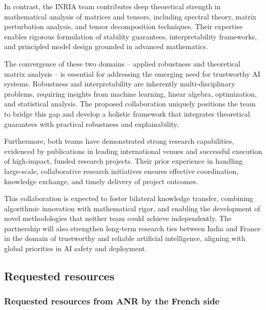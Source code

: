 \documentclass[a4paper,11pt]{article}
\begin{document}
In contrast, the INRIA team contributes deep theoretical strength in mathematical analysis of matrices and tensors, including spectral theory, matrix perturbation analysis, and tensor decomposition techniques. Their expertise enables rigorous formulation of stability guarantees, interpretability frameworks, and principled model design grounded in advanced mathematics.

The convergence of these two domains -- applied robustness and theoretical matrix analysis -- is essential for addressing the emerging need for trustworthy AI systems. Robustness and interpretability are inherently multi-disciplinary problems, requiring insights from machine learning, linear algebra, optimization, and statistical analysis. The proposed collaboration uniquely positions the team to bridge this gap and develop a holistic framework that integrates theoretical guarantees with practical robustness and explainability.

Furthermore, both teams have demonstrated strong research capabilities, evidenced by publications in leading international venues and successful execution of high-impact, funded research projects. Their prior experience in handling large-scale, collaborative research initiatives ensures effective coordination, knowledge exchange, and timely delivery of project outcomes.

This collaboration is expected to foster bilateral knowledge transfer, combining algorithmic innovation with mathematical rigor, and enabling the development of novel methodologies that neither team could achieve independently. The partnership will also strengthen long-term research ties between India and France in the domain of trustworthy and reliable artificial intelligence, aligning with global priorities in AI safety and deployment.



\subsection{Requested resources}
\label{sec:org:costs}

\subsubsection{Requested resources from ANR by the French side}
\end{document}
